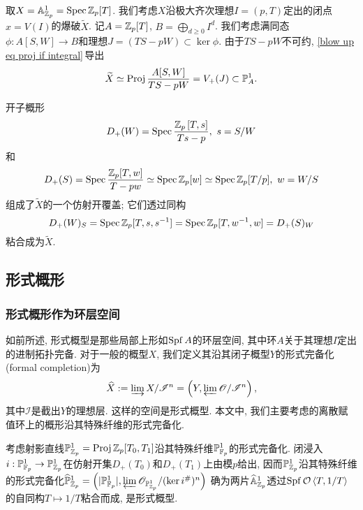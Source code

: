 
\begin{example}\label{eg: blow up of A^1_Zp}
    取$X = \A^1_{\Z_p} = \spec\Z_p[T]$. 我们考虑$X$沿极大齐次理想$I = (p, T)$定出的闭点${x} = V(I)$的爆破$\tilde{X}$.
    记$A = \Z_p[T]$, $B = \bigoplus_{d\ge 0}I^d$.
    我们考虑满同态$\phi : A[S, W]\to B$和理想$J = (TS - pW)\subset\ker\phi$.
    由于$TS-pW$不可约, \cref{blow up eq proj if integral}\,导出\[\tilde{X}\simeq\proj\frac{A[S, W]}{TS-pW} = V_+(J)\subset \P^1_{A}.\]

    开子概形\[D_+(W) = \spec \frac{\Z_p\left[ T, s \right]}{Ts-p},\ s = S/W\]
    和\[D_+(S) = \spec\frac{\Z_p[T, w]}{T-pw}\simeq\spec\Z_p[w] \simeq \spec\Z_p[T/p],\ w = W/S\]
    组成了$\tilde{X}$的一个仿射开覆盖; 它们透过同构
    \[D_+(W)_S = \spec \Z_p[T, s, s^{-1}] = \spec \Z_p[T, w^{-1}, w] = D_+(S)_W\]
    粘合成为$\tilde{X}$.


\end{example}

\subsection{形式概形}

\subsubsection{形式概形作为环层空间}
如前所述, 形式概型是那些局部上形如$\spf A$的环层空间, 其中环$A$关于其理想$I$定出的进制拓扑完备.
对于一般的概型$X$, 我们定义其沿其闭子概型$Y$的形式完备化(formal completion)为\[\hat{X} := \varinjlim X/\mathscr{I}^n = \left( Y, \varprojlim\mathscr{O}/\mathscr{I}^n\right),\]
其中$\mathscr{I}$是截出$Y$的理想层. 这样的空间是形式概型. 本文中, 我们主要考虑的离散赋值环上的概形沿其特殊纤维的形式完备化.
\begin{example}
    考虑射影直线$\P^1_{\Z_p}= \proj\Z_p[T_0, T_1]$沿其特殊纤维$\P^1_{\F_p}$的形式完备化.
    闭浸入$i : \P^1_{\F_p}\to\P^1_{\Z_p}$在仿射开集$D_+(T_0)$和$D_+(T_1)$上由模$p$给出,
    因而$\P^1_{\Z_p}$沿其特殊纤维的形式完备化$\hat{\P}^1_{\Z_p} = \left(|\P^1_{\F_p}|, \varprojlim \mathscr{O}_{\P^1_{\Z_p}}/(\ker i^\#)^n\right)$
    确为两片$\hat{\A}^1_{\Z_p}$透过$\spf\O\left< T, 1/T\right>$的自同构$T\mapsto 1/T$粘合而成, 是形式概型.
\end{example}

